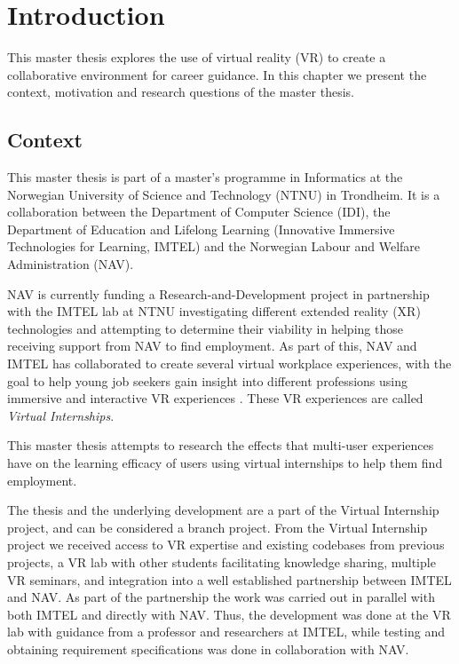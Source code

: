 
\chapter{Introduction}
\label{chapter:1}
This master thesis explores the use of virtual reality (VR) to create a collaborative environment for career guidance. In this chapter we present the context, motivation and research questions of the master thesis. 

\section{Context}
\label{section:context}
This master thesis is part of a master's programme in Informatics at the Norwegian University of Science and Technology (NTNU) in Trondheim. It is a collaboration between the Department of Computer Science (IDI), the Department of Education and Lifelong Learning (Innovative Immersive Technologies for Learning, IMTEL) and the Norwegian Labour and Welfare Administration (NAV). 

NAV is currently funding a Research-and-Development project in partnership with the IMTEL lab at NTNU investigating different extended reality (XR) technologies and attempting to determine their viability in helping those receiving support from NAV to find employment. As part of this, NAV and IMTEL has collaborated to create several virtual workplace experiences, with the goal to help young job seekers gain insight into different professions using immersive and interactive VR experiences \cite{IMTELinternships}. These VR experiences are called \textit{Virtual Internships}. 

This master thesis attempts to research the effects that multi-user experiences have on the learning efficacy of users using virtual internships to help them find employment.

The thesis and the underlying development are a part of the Virtual Internship project, and can be considered a branch project. From the Virtual Internship project we received access to VR expertise and existing codebases from previous projects, a VR lab with other students facilitating knowledge sharing, multiple VR seminars, and integration into a well established partnership between IMTEL and NAV.    
As part of the partnership the work was carried out in parallel with both IMTEL and directly with NAV. Thus, the development was done at the VR lab with guidance from a professor and researchers at IMTEL, while testing and obtaining requirement specifications was done in collaboration with NAV.    


